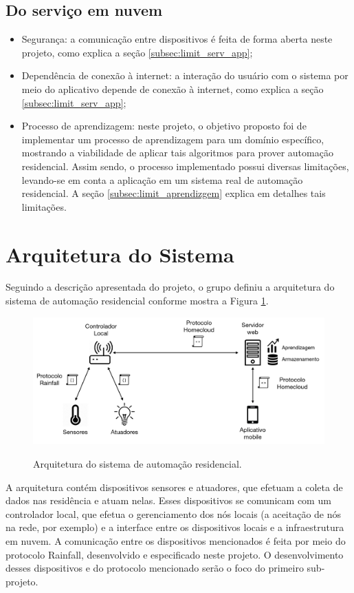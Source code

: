 \subsection{Do serviço em nuvem}
\begin{itemize}
	\item Segurança: a comunicação entre dispositivos é feita de forma aberta neste projeto, como explica a seção \ref{subsec:limit_serv_app};
	\item Dependência de conexão à internet: a interação do usuário com o sistema por meio do aplicativo depende de conexão à internet, como explica a seção \ref{subsec:limit_serv_app};
	\item Processo de aprendizagem: neste projeto, o objetivo proposto foi de implementar um processo de aprendizagem para um domínio específico, mostrando a viabilidade de aplicar tais algoritmos para prover automação residencial. Assim sendo, o processo implementado possui diversas limitações, levando-se em conta a aplicação em um sistema real de automação residencial. A seção \ref{subsec:limit_aprendizgem} explica em detalhes tais limitações.
\end{itemize}

\section{Arquitetura do Sistema} \label{sec:arquitetura}
Seguindo a descrição apresentada do projeto, o grupo definiu a arquitetura do sistema de automação residencial conforme mostra a Figura \ref{fig:arquitetura}.

\begin{figure}[h]
	\centering
	\caption{Arquitetura do sistema de automação residencial.}
  \includegraphics[width=\textwidth]{imagens/arquitetura.png}
  \label{fig:arquitetura}  
\end{figure}

A arquitetura contém dispositivos sensores e atuadores, que efetuam a coleta de dados nas residência e atuam nelas. Esses dispositivos se comunicam com um controlador local, que efetua o gerenciamento dos nós locais (a aceitação de nós na rede, por exemplo) e a interface entre os dispositivos locais e a infraestrutura em nuvem. A comunicação entre os dispositivos mencionados é feita por meio do protocolo Rainfall, desenvolvido e especificado neste projeto. O desenvolvimento desses dispositivos e do protocolo mencionado serão o foco do primeiro sub-projeto.

